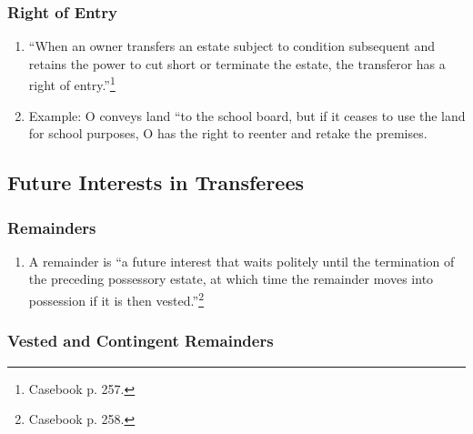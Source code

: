 \subsubsection{Right of Entry}

\begin{enumerate}
    \item ``When an owner transfers an estate subject to condition subsequent 
    and retains the power to cut short or terminate the estate, the transferor 
    has a right of entry.''\footnote{Casebook p. 257.}
    \item Example: O conveys land ``to the school board, but if it ceases to 
    use the land for school purposes, O has the right to reenter and retake 
    the premises.
\end{enumerate}

\subsection{Future Interests in Transferees}

\subsubsection{Remainders}

\begin{enumerate}
    \item A remainder is ``a future interest that waits politely until the 
    termination of the preceding possessory estate, at which time the 
    remainder moves into possession if it is then vested.''\footnote{Casebook 
    p. 258.}
\end{enumerate}

\subsubsection{Vested and Contingent Remainders}

